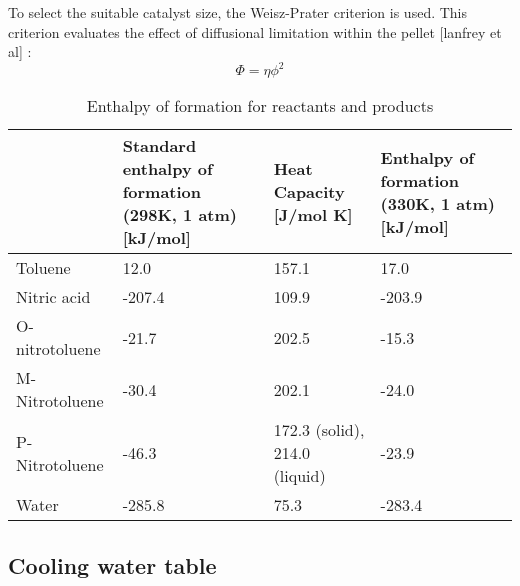 To select the suitable catalyst size, the Weisz-Prater criterion is used. This criterion evaluates the effect of diffusional limitation within the pellet [lanfrey et al] :
\begin{equation}
    \Phi = \eta \phi^2
\end{equation}

\begin{table}[H]
\centering
\caption{Enthalpy of formation for reactants and products}
\label{tab:Heat enthalpy table}
\begin{tabularx}{\linewidth}{l|XXX}
\toprule
                                                                & Standard enthalpy of formation (298K, 1 atm) [kJ/mol] & Heat Capacity [J/mol K] & Enthalpy of formation (330K, 1 atm) [kJ/mol] \\ \midrule
Toluene                        & 12.0              & 157.1              & 17.0                     \\
Nitric acid                      & -207.4              & 109.9              & -203.9                       \\
O-nitrotoluene & -21.7             & 202.5              & -15.3              \\ 
M-Nitrotoluene                      & -30.4              & 202.1             & -24.0                       \\
P-Nitrotoluene                      & -46.3              & 172.3 (solid), 214.0 (liquid)             & -23.9                        \\
Water                     & -285.8              & 75.3              & -283.4                        \\
\bottomrule
\end{tabularx}
\end{table}

\subsection{Cooling water table}
\begin{table}[h]
\centering
\caption{Cooling water sources for R101}
\label{tab:cwtable}
\end{table}


